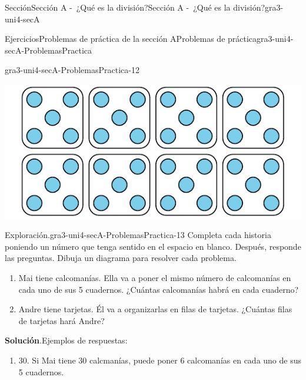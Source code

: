 \documentclass[oneside,10pt,]{article}
\newcommand{\blocktitlefont}{\relax}
\begin{document}
\begin{sectionptx}{Sección}{Sección A -~¿Qué es la división?}{}{Sección A -~¿Qué es la división?}{}{}{gra3-uni4-secA}
\begin{exercises-subsection}{Ejercicios}{Problemas de práctica de la sección A}{}{Problemas de práctica}{}{}{gra3-uni4-secA-ProblemasPractica}
\begin{divisionexercise}{10}{}{}{gra3-uni4-secA-ProblemasPractica-12}
\begin{enumerate}[label={(\alph*)}]
\begin{image}{0}{1}{0}{}
\includegraphics[width=\linewidth]{external/svg-source/tikz-file-152436.pdf}
\end{image}%
\end{enumerate}
\end{divisionexercise}%
\begin{divisionexercise}{11}{Exploración.}{}{gra3-uni4-secA-ProblemasPractica-13}%
Completa cada historia poniendo un número que tenga sentido en el espacio en blanco. Después, responde las preguntas. Dibuja un diagrama para resolver cada problema.%
\par
%
\begin{enumerate}[label={(\alph*)}]
\item{}Mai tiene \textunderscore{}\textunderscore{}\textunderscore{}\textunderscore{}\textunderscore{}\textunderscore{}\textunderscore{}\textunderscore{}\textunderscore{}\textunderscore{} calcomanías. Ella va a poner el mismo número de calcomanías en cada uno de sus 5 cuadernos. ¿Cuántas calcomanías habrá en cada cuaderno?%
\item{}Andre tiene \textunderscore{}\textunderscore{}\textunderscore{}\textunderscore{}\textunderscore{}\textunderscore{}\textunderscore{}\textunderscore{}\textunderscore{}\textunderscore{} tarjetas. Él va a organizarlas en filas de \textunderscore{}\textunderscore{}\textunderscore{}\textunderscore{}\textunderscore{}\textunderscore{}\textunderscore{}\textunderscore{}\textunderscore{}\textunderscore{} tarjetas. ¿Cuántas filas de tarjetas hará Andre?%
\end{enumerate}
%
\par\smallskip%
\noindent\textbf{\blocktitlefont Solución}.\hypertarget{gra3-uni4-secA-ProblemasPractica-13-3}{}\quad{}Ejemplos de respuestas:%
%
\begin{enumerate}[label={(\alph*)}]
\item{}30. Si Mai tiene 30 calcmanías, puede poner 6 calcomanías en cada uno de sus 5 cuadernos.%
\begin{image}{0}{1}{0}{}%

\end{image}
\end{enumerate}
\end{divisionexercise}
\end{exercises-subsection}
\end{sectionptx}
\end{document}
